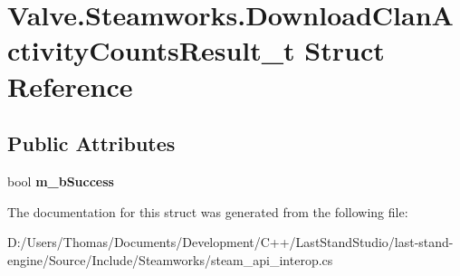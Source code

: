 \hypertarget{structValve_1_1Steamworks_1_1DownloadClanActivityCountsResult__t}{}\section{Valve.\+Steamworks.\+Download\+Clan\+Activity\+Counts\+Result\+\_\+t Struct Reference}
\label{structValve_1_1Steamworks_1_1DownloadClanActivityCountsResult__t}
\subsection*{Public Attributes}
\begin{DoxyCompactItemize}
\item 
\hypertarget{structValve_1_1Steamworks_1_1DownloadClanActivityCountsResult__t_add4bfbfae0cbb0e3595b86ae71e3b9bf}{}bool {\bfseries m\+\_\+b\+Success}\label{structValve_1_1Steamworks_1_1DownloadClanActivityCountsResult__t_add4bfbfae0cbb0e3595b86ae71e3b9bf}

\end{DoxyCompactItemize}


The documentation for this struct was generated from the following file\+:\begin{DoxyCompactItemize}
\item 
D\+:/\+Users/\+Thomas/\+Documents/\+Development/\+C++/\+Last\+Stand\+Studio/last-\/stand-\/engine/\+Source/\+Include/\+Steamworks/steam\+\_\+api\+\_\+interop.\+cs\end{DoxyCompactItemize}
